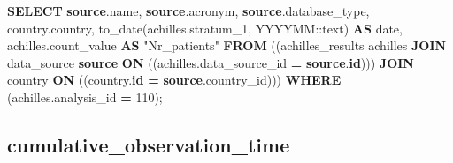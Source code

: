 \documentclass[
]{book}
\newenvironment{Shaded}{\begin{snugshade}}{\end{snugshade}}
\newcommand{\CharTok}[1]{\textcolor[rgb]{0.31,0.60,0.02}{#1}}
\newcommand{\DataTypeTok}[1]{\textcolor[rgb]{0.13,0.29,0.53}{#1}}
\newcommand{\DecValTok}[1]{\textcolor[rgb]{0.00,0.00,0.81}{#1}}
\newcommand{\FunctionTok}[1]{\textcolor[rgb]{0.00,0.00,0.00}{#1}}
\newcommand{\KeywordTok}[1]{\textcolor[rgb]{0.13,0.29,0.53}{\textbf{#1}}}
\newcommand{\NormalTok}[1]{#1}
\newcommand{\OperatorTok}[1]{\textcolor[rgb]{0.81,0.36,0.00}{\textbf{#1}}}
\newcommand{\OtherTok}[1]{\textcolor[rgb]{0.56,0.35,0.01}{#1}}
\newcommand{\StringTok}[1]{\textcolor[rgb]{0.31,0.60,0.02}{#1}}
\begin{document}
\begin{Shaded}
\begin{Highlighting}[]
\KeywordTok{SELECT} \KeywordTok{source}\NormalTok{.name,}
   \KeywordTok{source}\NormalTok{.acronym,}
   \KeywordTok{source}\NormalTok{.database\_type,}
\NormalTok{   country.country,}
   \FunctionTok{to\_date}\NormalTok{(achilles.stratum\_1, }\StringTok{\textquotesingle{}YYYYMM\textquotesingle{}}\NormalTok{:}\CharTok{:text}\NormalTok{) }\KeywordTok{AS} \DataTypeTok{date}\NormalTok{,}
\NormalTok{   achilles.count\_value }\KeywordTok{AS} \OtherTok{"Nr\_patients"}
  \KeywordTok{FROM}\NormalTok{ ((achilles\_results achilles}
    \KeywordTok{JOIN}\NormalTok{ data\_source }\KeywordTok{source} \KeywordTok{ON}\NormalTok{ ((achilles.data\_source\_id }\OperatorTok{=} \KeywordTok{source}\NormalTok{.}\KeywordTok{id}\NormalTok{)))}
    \KeywordTok{JOIN}\NormalTok{ country }\KeywordTok{ON}\NormalTok{ ((country.}\KeywordTok{id} \OperatorTok{=} \KeywordTok{source}\NormalTok{.country\_id)))}
 \KeywordTok{WHERE}\NormalTok{ (achilles.analysis\_id }\OperatorTok{=} \DecValTok{110}\NormalTok{);}
\end{Highlighting}
\end{Shaded}

\hypertarget{cumulative_observation_time}{%
\subsection*{cumulative\_observation\_time}\label{cumulative_observation_time}}
\end{document}
